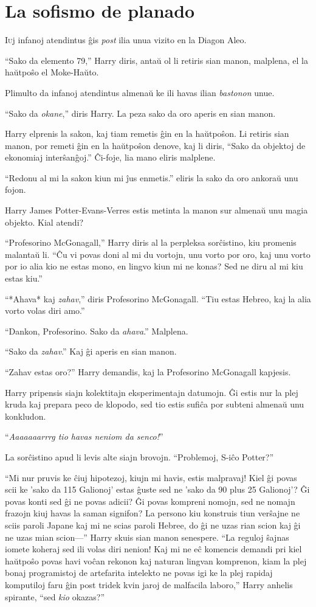 \chapter{La sofismo de planado}


\lettrine{I}uj infanoj atendintus ĝis \emph{post} ilia unua vizito en la Diagon Aleo.

``Sako da elemento 79,'' Harry diris, antaŭ ol li retiris sian manon,
malplena, el la haŭtpoŝo el Moke-Haŭto.

Plimulto da infanoj atendintus almenaŭ ke ili havas ilian
\emph{bastonon} unue.

``Sako da \emph{okane},'' diris Harry. La peza sako da oro aperis en sian manon.

Harry elprenis la sakon, kaj tiam remetis ĝin en la haŭtpoŝon. Li
retiris sian manon, por remeti ĝin en la haŭtpoŝon denove, kaj li
diris, ``Sako da objektoj de ekonomiaj interŝanĝoj.'' Ĉi-foje, lia
mano eliris malplene.

``Redonu al mi la sakon kiun mi ĵus enmetis.'' eliris la sako da oro
ankoraŭ unu fojon.

Harry James Potter-Evans-Verres estis metinta la manon sur almenaŭ
unu magia objekto. Kial atendi?

``Profesorino McGonagall,'' Harry diris al la perpleksa sorĉistino,
kiu promenis malantaŭ li. ``Ĉu vi povas doni al mi du vortojn, unu
vorto por oro, kaj unu vorto por io alia kio ne estas mono, en lingvo
kiun mi ne konas? Sed ne diru al mi kiu estas kiu.''

``*Ahava* kaj \emph{zahav},'' diris Profesorino McGonagall. ``Tiu
estas Hebreo, kaj la alia vorto volas diri amo.''

``Dankon, Profesorino. Sako da \emph{ahava}.'' Malplena.

``Sako da \emph{zahav}.'' Kaj ĝi aperis en sian manon.

``Zahav estas oro?'' Harry demandis, kaj la Profesorino McGonagall
kapjesis.

Harry pripensis siajn kolektitajn eksperimentajn datumojn. Ĝi estis
nur la plej kruda kaj prepara peco de klopodo, sed tio estis sufiĉa
por subteni almenaŭ unu konkludon.

``\emph{Aaaaaaarrrg tio havas neniom da senco!}''

La sorĉistino apud li levis alte siajn brovojn. ``Problemoj, S-iĉo
Potter?''

``Mi nur pruvis ke ĉiuj hipotezoj, kiujn mi havis, estis malpravaj!
Kiel ĝi povas scii ke 'sako da 115 Galionoj' estas ĝuste sed ne 'sako
da 90 plus 25 Galionoj'? Ĝi povas konti sed ĝi ne povas adicii? Ĝi
povas kompreni nomojn, sed ne nomajn frazojn kiuj havas la saman
signifon? La persono kiu konstruis tiun verŝajne ne sciis paroli
Japane kaj mi ne scias paroli Hebree, do ĝi ne uzas rian scion kaj ĝi
ne uzas mian scion—'' Harry skuis sian manon senespere. ``La reguloj
ŝajnas iomete koheraj sed ili volas diri nenion!  Kaj mi ne eĉ
komencis demandi pri kiel haŭtpoŝo povas havi voĉan rekonon kaj
naturan lingvan komprenon, kiam la plej bonaj programistoj de
artefarita intelekto ne povas igi ke la plej rapidaj komputiloj faru
ĝin post tridek kvin jaroj de malfacila laboro,'' Harry anhelis
spirante, ``sed \emph{kio} okazas?''

